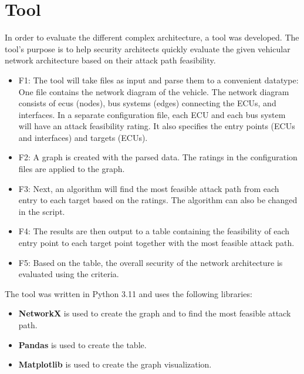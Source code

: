 \chapter{Tool}
\label{chp:tool}

In order to evaluate the different complex architecture, a tool was developed.
The tool's purpose is to help security architects quickly evaluate the given vehicular network architecture based on their \gls{attack path} feasibility.

\begin{itemize}

    \item F1\label{sec:f1}: The tool will take files as input and parse them to a convenient datatype: 
    One file contains the network diagram of the vehicle.
    The network diagram consists of \gls{ecu}s (nodes), bus systems (edges) connecting the ECUs, and interfaces. 
    In a separate configuration file, each ECU and each bus system will have an attack feasibility rating. 
    It also specifies the entry points (ECUs and interfaces) and targets (ECUs).
    
    \item F2\label{sec:f2}: A graph is created with the parsed data. The ratings in the configuration files are applied to the graph.
    
    \item F3\label{sec:f3}: Next, an algorithm will find the most feasible attack path from each entry to each target based on the ratings. The algorithm can also be changed in the script. 
    
    \item F4\label{sec:f4}: The results are then output to a table containing the feasibility of each entry point to each target point together with the most feasible attack path.
    
    \item F5\label{sec:f5}: Based on the table, the overall security of the network architecture is evaluated using the criteria.
    
    \end{itemize}

The tool was written in Python 3.11 and uses the following libraries:

\begin{itemize}

    \item \textbf{NetworkX} \cite{networkx} is used to create the graph and to find the most feasible attack path.
    
    \item \textbf{Pandas} \cite{pandas} is used to create the table.
    
    \item \textbf{Matplotlib} \cite{matplotlib} is used to create the graph visualization.
    
\end{itemize}